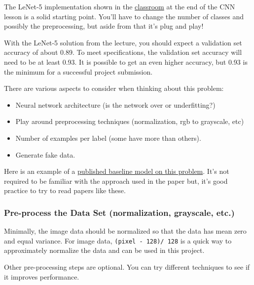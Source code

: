 \documentclass[11pt]{article}
\providecommand{\tightlist}{%
      \setlength{\itemsep}{0pt}\setlength{\parskip}{0pt}}
\begin{document}
The LeNet-5 implementation shown in the
\href{https://classroom.udacity.com/nanodegrees/nd013/parts/fbf77062-5703-404e-b60c-95b78b2f3f9e/modules/6df7ae49-c61c-4bb2-a23e-6527e69209ec/lessons/601ae704-1035-4287-8b11-e2c2716217ad/concepts/d4aca031-508f-4e0b-b493-e7b706120f81}{classroom}
at the end of the CNN lesson is a solid starting point. You'll have to
change the number of classes and possibly the preprocessing, but aside
from that it's plug and play!

With the LeNet-5 solution from the lecture, you should expect a
validation set accuracy of about 0.89. To meet specifications, the
validation set accuracy will need to be at least 0.93. It is possible to
get an even higher accuracy, but 0.93 is the minimum for a successful
project submission.

There are various aspects to consider when thinking about this problem:

\begin{itemize}
\tightlist
\item
  Neural network architecture (is the network over or underfitting?)
\item
  Play around preprocessing techniques (normalization, rgb to grayscale,
  etc)
\item
  Number of examples per label (some have more than others).
\item
  Generate fake data.
\end{itemize}

Here is an example of a
\href{http://yann.lecun.com/exdb/publis/pdf/sermanet-ijcnn-11.pdf}{published
baseline model on this problem}. It's not required to be familiar with
the approach used in the paper but, it's good practice to try to read
papers like these.

    \hypertarget{pre-process-the-data-set-normalization-grayscale-etc.}{%
\subsubsection{Pre-process the Data Set (normalization, grayscale,
etc.)}\label{pre-process-the-data-set-normalization-grayscale-etc.}}

    Minimally, the image data should be normalized so that the data has mean
zero and equal variance. For image data, \texttt{(pixel\ -\ 128)/\ 128}
is a quick way to approximately normalize the data and can be used in
this project.

Other pre-processing steps are optional. You can try different
techniques to see if it improves performance.
\end{document}
